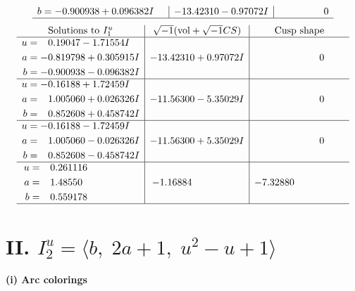 \documentclass[1p]{elsarticle_modified}
\theoremstyle{definition}
\newcommand{\I}{\sqrt{-1}}
\begin{document}
$$\begin{array}{c|c|c}
\begin{aligned}
b &= -0.900938 + 0.096382 I\end{aligned}
 & -13.42310 - 0.97072 I & \phantom{-0.000000 } 0\\
 \hline 
 \end{array}$$\newpage$$\begin{array}{c|c|c}  
\text{Solutions to }I^u_{1}& \I (\text{vol} + \sqrt{-1}CS) & \text{Cusp shape}\\
 \hline 
\begin{aligned}
u &= \phantom{-}0.19047 - 1.71554 I \\
a &= -0.819798 + 0.305915 I \\
b &= -0.900938 - 0.096382 I\end{aligned}
 & -13.42310 + 0.97072 I & \phantom{-0.000000 } 0 \\ \hline\begin{aligned}
u &= -0.16188 + 1.72459 I \\
a &= \phantom{-}1.005060 + 0.026326 I \\
b &= \phantom{-}0.852608 + 0.458742 I\end{aligned}
 & -11.56300 - 5.35029 I & \phantom{-0.000000 } 0 \\ \hline\begin{aligned}
u &= -0.16188 - 1.72459 I \\
a &= \phantom{-}1.005060 - 0.026326 I \\
b &= \phantom{-}0.852608 - 0.458742 I\end{aligned}
 & -11.56300 + 5.35029 I & \phantom{-0.000000 } 0 \\ \hline\begin{aligned}
u &= \phantom{-}0.261116\phantom{ +0.000000I} \\
a &= \phantom{-}1.48550\phantom{ +0.000000I} \\
b &= \phantom{-}0.559178\phantom{ +0.000000I}\end{aligned}
 & -1.16884\phantom{ +0.000000I} & -7.32880\phantom{ +0.000000I}\\
 \hline 
 \end{array}$$\newpage\newpage\renewcommand{\arraystretch}{1}
\centering \section*{II. $I^u_{2}= \langle b,\;2 a+1,\;u^2- u+1 \rangle$}
\flushleft \textbf{(i) Arc colorings}\\
\end{document}

